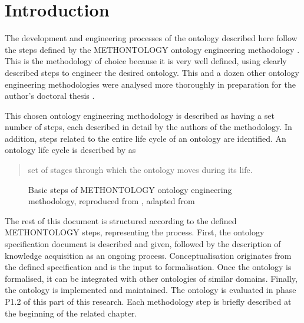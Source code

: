 \chapter*{Introduction}

The development and engineering processes of the ontology described here follow the steps defined by the METHONTOLOGY ontology engineering methodology \cite{fernandez-lopez1997METHONTOLOGYOntologicalArt, okresaduric2019OrganizationalModelingLargeScale}. This is the methodology of choice because it is very well defined, using clearly described steps to engineer the desired ontology. This and a dozen other ontology engineering methodologies were analysed more thoroughly in preparation for the author's doctoral thesis \cite{okresaduric2019OrganizationalModelingLargeScale}.

This chosen ontology engineering methodology is described as having a set number of steps,%
each described in detail by the authors of the methodology. In addition, steps related to the entire life cycle of an ontology are identified. An ontology life cycle is described by \citeauthor{iqbal2013AnalysisOntologyEngineering} as \blockquote[{\cite[p. 2997]{iqbal2013AnalysisOntologyEngineering}}]{ set of stages through which the ontology moves during its life.} 

\begin{figure}
    \resizebox{\linewidth}{!}{}
    \caption{Basic steps of METHONTOLOGY ontology engineering methodology, reproduced from \cite{okresaduric2019OrganizationalModelingLargeScale}, adapted from \cite{fernandez-lopez1997METHONTOLOGYOntologicalArt}}
    \label{fig:methontology steps}
\end{figure}

The rest of this document is structured according to the defined METHONTOLOGY steps, representing the  process. First, the ontology specification%
document is described and given, followed by the description of knowledge acquisition%
as an ongoing process.
Conceptualisation%
originates from the defined specification and is the input to formalisation.%
Once the ontology is formalised, it can be integrated%
with other ontologies of similar domains. Finally, the ontology is implemented and maintained.%
The ontology is evaluated in phase P1.2 of this part of this research.%
Each methodology step is briefly described at the beginning of the related chapter.